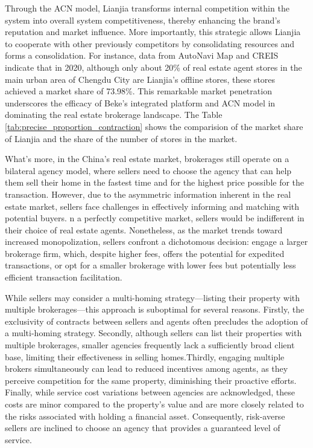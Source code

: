 \documentclass[12pt]{article}
\begin{document}
Through the ACN model, Lianjia transforms internal competition within the system into overall system competitiveness, thereby enhancing the brand's reputation and market influence. More importantly, this strategic allows Lianjia to cooperate with other previously competitors by consolidating resources and forms a consolidation. For instance, data from AutoNavi Map and CREIS indicate that in 2020, although only about 20\% of real estate agent stores in the main urban area of Chengdu City are Lianjia's offline stores, these stores achieved a market share of 73.98\%. This remarkable market penetration underscores the efficacy of Beke's integrated platform and ACN model in dominating the real estate brokerage landscape. The Table \ref{tab:precise_proportion_contraction} shows the comparision of the market share of Lianjia and the share of the number of stores in the market.

What's more, in the China's real estate market, brokerages still operate on a bilateral agency model, where sellers need to choose the agency that can help them sell their home in the fastest time and for the highest price possible for the transaction. However, due to the asymmetric information inherent in the real estate market, sellers face challenges in effectively informing and matching with potential buyers. n a perfectly competitive market, sellers would be indifferent in their choice of real estate agents. Nonetheless, as the market trends toward increased monopolization, sellers confront a dichotomous decision: engage a larger brokerage firm, which, despite higher fees, offers the potential for expedited transactions, or opt for a smaller brokerage with lower fees but potentially less efficient transaction facilitation.

While sellers may consider a multi-homing strategy—listing their property with multiple brokerages—this approach is suboptimal for several reasons. Firstly, the exclusivity of contracts between sellers and agents often precludes the adoption of a multi-homing strategy. Secondly, although sellers can list their properties with multiple brokerages, smaller agencies frequently lack a sufficiently broad client base, limiting their effectiveness in selling homes.Thirdly, engaging multiple brokers simultaneously can lead to reduced incentives among agents, as they perceive competition for the same property, diminishing their proactive efforts. Finally, while service cost variations between agencies are acknowledged, these costs are minor compared to the property's value and are more closely related to the risks associated with holding a financial asset. Consequently, risk-averse sellers are inclined to choose an agency that provides a guaranteed level of service. 
\end{document}
